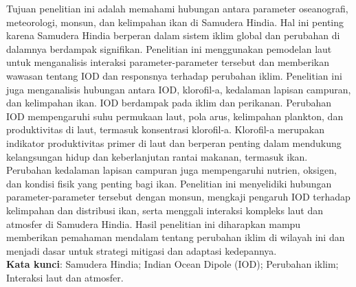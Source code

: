 \begin{spacing}{1.5}
	\pagestyle{empty}
	\begin{center}
		\vskip 1cm
		\justifying
		Tujuan penelitian ini adalah memahami hubungan antara parameter oseanografi, meteorologi, monsun, dan kelimpahan ikan di Samudera Hindia. Hal ini penting karena Samudera Hindia berperan dalam sistem iklim global dan perubahan di dalamnya berdampak signifikan. Penelitian ini menggunakan pemodelan laut untuk menganalisis interaksi parameter-parameter tersebut dan memberikan wawasan tentang IOD dan responsnya terhadap perubahan iklim. Penelitian ini juga menganalisis hubungan antara IOD, klorofil-a, kedalaman lapisan campuran, dan kelimpahan ikan. IOD berdampak pada iklim dan perikanan. Perubahan IOD mempengaruhi suhu permukaan laut, pola arus, kelimpahan plankton, dan produktivitas di laut, termasuk konsentrasi klorofil-a. Klorofil-a merupakan indikator produktivitas primer di laut dan berperan penting dalam mendukung kelangsungan hidup dan keberlanjutan rantai makanan, termasuk ikan. Perubahan kedalaman lapisan campuran juga mempengaruhi nutrien, oksigen, dan kondisi fisik yang penting bagi ikan. Penelitian ini menyelidiki hubungan parameter-parameter tersebut dengan monsun, mengkaji pengaruh IOD terhadap kelimpahan dan distribusi ikan, serta menggali interaksi kompleks laut dan atmosfer di Samudera Hindia. Hasil penelitian ini diharapkan mampu memberikan pemahaman mendalam tentang perubahan iklim di wilayah ini dan menjadi dasar untuk strategi mitigasi dan adaptasi kedepannya.\\
		\textbf{Kata kunci}: Samudera Hindia; Indian Ocean Dipole (IOD); Perubahan iklim; Interaksi laut dan atmosfer.
	\end{center}
\end{spacing}
\pagestyle{empty}